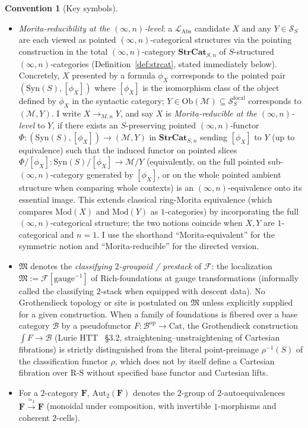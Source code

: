 \documentclass[11pt]{article}
\theoremstyle{plain}
\theoremstyle{definition}
\newtheorem{convention}[theorem]{Convention}
\newcommand{\RS}{\mathrm{R\text{-}S}}
\newcommand{\cS}{\mathcal{S}}
\newcommand{\cF}{\mathcal{F}}
\newcommand{\cM}{\mathcal{M}}
\newcommand{\fM}{\mathfrak{M}}
\newcommand{\LAbs}{\mathcal{L}_{\mathrm{Abs}}}
\newcommand{\Ob}{\mathrm{Ob}}
\newcommand{\Cat}{\mathrm{Cat}}
\newcommand{\Syn}{\mathrm{Syn}}
\newcommand{\Mod}{\mathrm{Mod}}
\begin{document}
\begin{convention}[Key symbols]
\begin{itemize}
\item \emph{Morita-reducibility at the $(\infty, n)$-level}: a $\LAbs$ candidate $X$ and any $Y \in \cS_S$ are each viewed as pointed $(\infty, n)$-categorical structures via the pointing construction in the total $(\infty, n)$-category $\mathbf{StrCat}_{S, n}$ of $S$-structured $(\infty, n)$-categories (Definition~\ref{def:strcat}, stated immediately below). Concretely, $X$ presented by a formula $\phi_X$ corresponds to the pointed pair $(\Syn(S), [\phi_X])$ where $[\phi_X]$ is the isomorphism class of the object defined by $\phi_X$ in the syntactic category; $Y \in \Ob(\cM) \subseteq \cS_S^{\mathrm{local}}$ corresponds to $(\cM, Y)$. I write $X \to_{M, n} Y$, and say $X$ is \emph{Morita-reducible at the $(\infty, n)$-level} to $Y$, if there exists an $S$-preserving pointed $(\infty, n)$-functor $\Phi : (\Syn(S), [\phi_X]) \to (\cM, Y)$ in $\mathbf{StrCat}_{S, n}$ sending $[\phi_X]$ to $Y$ (up to equivalence) such that the induced functor on pointed slices $\Phi/[\phi_X] : \Syn(S)/[\phi_X] \to \cM/Y$ (equivalently, on the full pointed sub-$(\infty, n)$-category generated by $[\phi_X]$, or on the whole pointed ambient structure when comparing whole contexts) is an $(\infty, n)$-equivalence onto its essential image. This extends classical ring-Morita equivalence (which compares $\Mod(X)$ and $\Mod(Y)$ as $1$-categories) by incorporating the full $(\infty, n)$-categorical structure; the two notions coincide when $X, Y$ are $1$-categorical and $n = 1$. I use the shorthand ``Morita-equivalent'' for the symmetric notion and ``Morita-reducible'' for the directed version.
\item $\fM$ denotes the \emph{classifying $2$-groupoid / prestack} of $\cF$: the localization $\fM := \cF[\mathrm{gauge}^{-1}]$ of Rich-foundations at gauge transformations (informally called the classifying $2$-stack when equipped with descent data). No Grothendieck topology or site is postulated on $\fM$ unless explicitly supplied for a given construction. When a family of foundations is fibered over a base category $\mathcal{B}$ by a pseudofunctor $F : \mathcal{B}^{\mathrm{op}} \to \Cat$, the Grothendieck construction $\int F \to \mathcal{B}$ (Lurie HTT~\cite{LurieHTT} \S 3.2, straightening--unstraightening of Cartesian fibrations) is strictly distinguished from the literal point-preimage $\rho^{-1}(S)$ of the classification functor $\rho$, which does not by itself define a Cartesian fibration over $\RS$ without specified base functor and Cartesian lifts.
\item For a $2$-category $\mathbf{F}$, $\mathrm{Aut}_2(\mathbf{F})$ denotes the $2$-group of $2$-autoequivalences $\mathbf{F} \xrightarrow{\simeq_2} \mathbf{F}$ (monoidal under composition, with invertible $1$-morphisms and coherent $2$-cells).

\end{itemize}
\end{convention}
\end{document}
